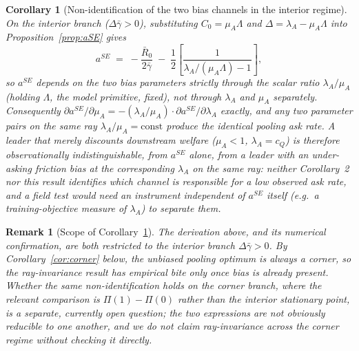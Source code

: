 \documentclass[11pt]{article}
\newtheorem{corollary}{Corollary}
\newtheorem{remark}{Remark}
\begin{document}
\begin{corollary}[Non-identification of the two bias channels in the interior regime]
\label{cor:mu-lambda}
On the interior branch ($\Delta\bar\gamma>0$), substituting $C_0=\mu_A\Lambda$ and
$\Delta=\lambda_A-\mu_A\Lambda$ into Proposition~\ref{prop:aSE} gives
\[
a^{SE} \;=\; -\frac{\bar R_0}{2\bar\gamma} \;-\; \frac{1}{2}
\left[\frac{1}{\lambda_A/(\mu_A\Lambda)-1}\right],
\]
so $a^{SE}$ depends on the two bias parameters strictly through the scalar ratio
$\lambda_A/\mu_A$ (holding $\Lambda$, the model primitive, fixed), not through
$\lambda_A$ and $\mu_A$ separately. Consequently
$\partial a^{SE}/\partial\mu_A = -(\lambda_A/\mu_A)\cdot\partial
a^{SE}/\partial\lambda_A$ exactly, and any two parameter pairs on the same ray
$\lambda_A/\mu_A=\text{const}$ produce the identical pooling ask rate. A leader
that merely discounts downstream welfare ($\mu_A<1$, $\lambda_A=c_Q$) is
therefore observationally indistinguishable, from $a^{SE}$ alone, from a leader
with an under-asking friction bias at the corresponding $\lambda_A$ on the same
ray: neither Corollary~2 nor this result identifies which channel is responsible
for a low observed ask rate, and a field test would need an instrument
independent of $a^{SE}$ itself (e.g.\ a training-objective measure of
$\lambda_A$) to separate them.
\end{corollary}

\begin{remark}[Scope of Corollary~\ref{cor:mu-lambda}]
The derivation above, and its numerical confirmation, are both restricted to the
interior branch $\Delta\bar\gamma>0$. By Corollary~\ref{cor:corner} below, the
\emph{unbiased} pooling optimum is always a corner, so the ray-invariance result
has empirical bite only once bias is already present. Whether the same
non-identification holds on the corner branch, where the relevant comparison is
$\Pi(1)-\Pi(0)$ rather than the interior stationary point, is a separate,
currently open question; the two expressions are not obviously reducible to one
another, and we do not claim ray-invariance across the corner regime without
checking it directly.
\end{remark}
\end{document}
